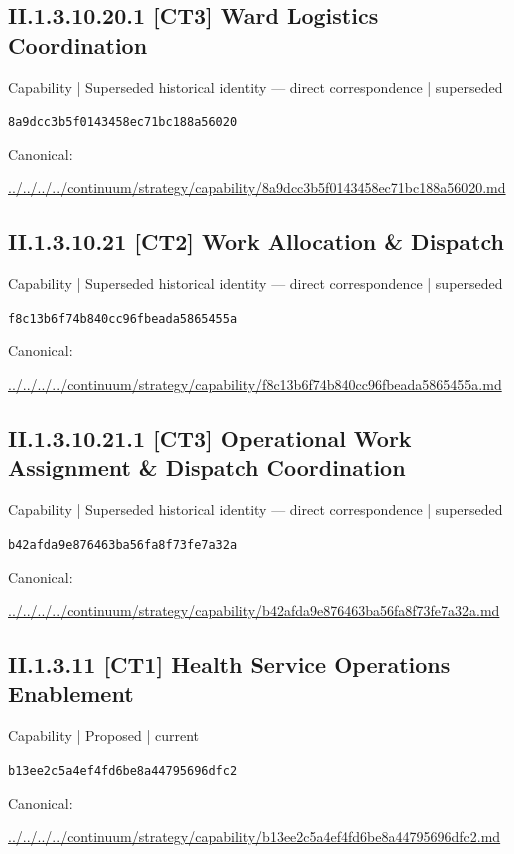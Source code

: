 \documentclass[10pt,a4paper]{article}
\begin{document}
\subsection*{II.1.3.10.20.1 [CT3] Ward Logistics Coordination}
{\small Capability | Superseded historical identity — direct correspondence | superseded}\par
\texttt{8a9dcc3b5f0143458ec71bc188a56020}\par
Canonical: \par
{\footnotesize\url{../../../../continuum/strategy/capability/8a9dcc3b5f0143458ec71bc188a56020.md}}\par
\subsection*{II.1.3.10.21 [CT2] Work Allocation \& Dispatch}
{\small Capability | Superseded historical identity — direct correspondence | superseded}\par
\texttt{f8c13b6f74b840cc96fbeada5865455a}\par
Canonical: \par
{\footnotesize\url{../../../../continuum/strategy/capability/f8c13b6f74b840cc96fbeada5865455a.md}}\par
\subsection*{II.1.3.10.21.1 [CT3] Operational Work Assignment \& Dispatch Coordination}
{\small Capability | Superseded historical identity — direct correspondence | superseded}\par
\texttt{b42afda9e876463ba56fa8f73fe7a32a}\par
Canonical: \par
{\footnotesize\url{../../../../continuum/strategy/capability/b42afda9e876463ba56fa8f73fe7a32a.md}}\par
\subsection*{II.1.3.11 [CT1] Health Service Operations Enablement}
{\small Capability | Proposed | current}\par
\texttt{b13ee2c5a4ef4fd6be8a44795696dfc2}\par
Canonical: \par
{\footnotesize\url{../../../../continuum/strategy/capability/b13ee2c5a4ef4fd6be8a44795696dfc2.md}}\par
\end{document}
